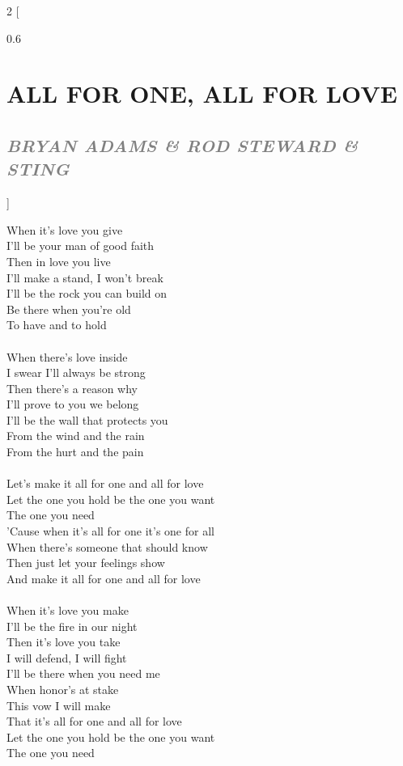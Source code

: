 \documentclass[100pt,a4paper]{report}
\newenvironment{song2}[2]
	{	
    	\begin{multicols*}{2}
		[
			\begin{spacing}{0.6}
				\section*{\LARGE\centering \MakeUppercase{\textbf{{#1}}}}
				\subsection*{\Large\centering \textit{\textcolor{gray}{\MakeUppercase{{#2}}}}}
			\end{spacing}
		]
		\Large
	}
	{
	\end{multicols*}
	\newpage
    }
\begin{document}
\begin{song2}{All for One, All for Love}{Bryan Adams \& Rod Steward \& Sting}
\noindent
When it's love you give\\
I'll be your man of good faith\\
Then in love you live\\
I'll make a stand, I won't break\\
I'll be the rock you can build on\\
Be there when you're old\\
To have and to hold\\
\\
When there's love inside\\
I swear I'll always be strong\\
Then there's a reason why\\
I'll prove to you we belong\\
I'll be the wall that protects you\\
From the wind and the rain\\
From the hurt and the pain\\
\\
Let's make it all for one and all for love\\
Let the one you hold be the one you want\\
The one you need\\
'Cause when it's all for one it's one for all\\
When there's someone that should know\\
Then just let your feelings show\\
And make it all for one and all for love\\
\\
When it's love you make\\
I'll be the fire in our night\\
Then it's love you take\\
I will defend, I will fight\\
I'll be there when you need me\\
When honor's at stake\\
This vow I will make\\
\vfill
\columnbreak
\noindent
That it's all for one and all for love\\
Let the one you hold be the one you want\\
The one you need\\

\end{song2}
\end{document}
